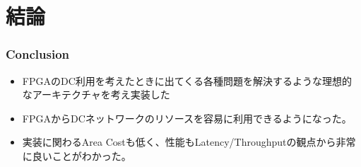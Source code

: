 \documentclass[dvipdfmx,9pt,notheorems]{beamer}
\theoremstyle{definition}
\begin{document}
\section{結論}
\begin{frame}\frametitle{Conclusion}
	\begin{itemize}
		\item FPGAのDC利用を考えたときに出てくる各種問題を解決するような理想的なアーキテクチャを考え実装した
		\item FPGAからDCネットワークのリソースを容易に利用できるようになった。
		\item 実装に関わるArea Costも低く、性能もLatency/Throughputの観点から非常に良いことがわかった。
	\end{itemize}
\pnote{
}
\end{frame}


\setcounter{finalframe}{\value{framenumber}}
\setcounter{framenumber}{\value{finalframe}}
\end{document}
